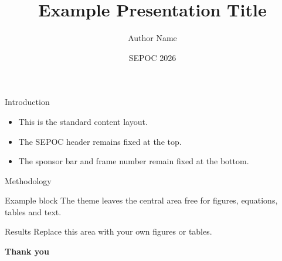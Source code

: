 \documentclass[aspectratio=169,11pt]{beamer}
\title{Example Presentation Title}
\author{Author Name}
\institute{Federal University of Santa Maria -- UFSM}
\date{SEPOC 2026}
\begin{document}
\begin{frame}
  \titlepage
\end{frame}

\begin{frame}{Introduction}
  \begin{itemize}
    \item This is the standard content layout.
    \item The SEPOC header remains fixed at the top.
    \item The sponsor bar and frame number remain fixed at the bottom.
  \end{itemize}
\end{frame}

\begin{frame}{Methodology}
  \begin{block}{Example block}
    The theme leaves the central area free for figures, equations, tables and text.
  \end{block}
\end{frame}

\begin{frame}{Results}
  \centering
  Replace this area with your own figures or tables.
\end{frame}

\begin{frame}[plain]
  \centering
  \vfill
  {\Huge\bfseries Thank you}
  \vfill
\end{frame}
\end{document}
